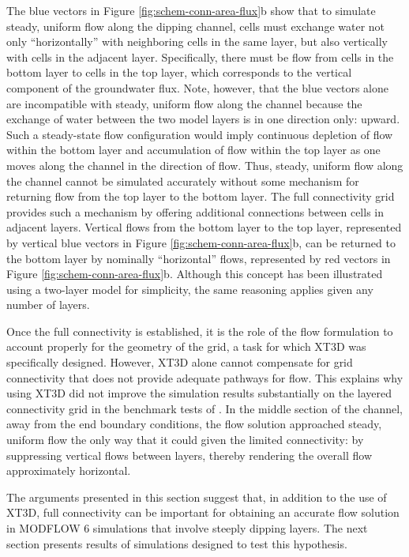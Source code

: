 \documentclass{article}
\begin{document}
The blue vectors in Figure \ref{fig:schem-conn-area-flux}b show that to simulate steady, uniform flow along the dipping channel, cells must exchange water not only ``horizontally'' with neighboring cells in the same layer, but also vertically with cells in the adjacent layer. Specifically, there must be flow from cells in the bottom layer to cells in the top layer, which corresponds to the vertical component of the groundwater flux. Note, however, that the blue vectors alone are incompatible with steady, uniform flow along the channel because the exchange of water between the two model layers is in one direction only: upward. Such a steady-state flow configuration would imply continuous depletion of flow within the bottom layer and accumulation of flow within the top layer as one moves along the channel in the direction of flow. Thus, steady, uniform flow along the channel cannot be simulated accurately without some mechanism for returning flow from the top layer to the bottom layer. The full connectivity grid provides such a mechanism by offering additional connections between cells in adjacent layers. Vertical flows from the bottom layer to the top layer, represented by vertical blue vectors in Figure \ref{fig:schem-conn-area-flux}b, can be returned to the bottom layer by nominally ``horizontal'' flows, represented by red vectors in Figure \ref{fig:schem-conn-area-flux}b. Although this concept has been illustrated using a two-layer model for simplicity, the same reasoning applies given any number of layers.

Once the full connectivity is established, it is the role of the flow formulation to account properly for the geometry of the grid, a task for which XT3D was specifically designed. However, XT3D alone cannot compensate for grid connectivity that does not provide adequate pathways for flow. This explains why using XT3D did not improve the simulation results substantially on the layered connectivity grid in the benchmark tests of \cite{bardot2022}.  In the middle section of the channel, away from the end boundary conditions, the flow solution approached steady, uniform flow the only way that it could given the limited connectivity: by suppressing vertical flows between layers, thereby rendering the overall flow approximately horizontal.

The arguments presented in this section suggest that, in addition to the use of XT3D, full connectivity can be important for obtaining an accurate flow solution in MODFLOW 6 simulations that involve steeply dipping layers. The next section presents results of simulations designed to test this hypothesis.
\end{document}
